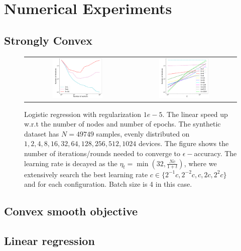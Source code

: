 


\section{Numerical Experiments}



\subsection{Strongly Convex}

\begin{figure}[h!]
\centering
\begin{tabular}{cc}
	\includegraphics[width=0.5\textwidth]{fig/E1-4-16speedupNodesT-min-w8a-epsilon013-b4-reg1e-05-adapt0.pdf} & 
\includegraphics[width=0.5\textwidth]{fig/E1-4-16speedupEpochsT-min-w8a-epsilon013-b4-reg1e-05-adapt0.pdf} 
\end{tabular}
	\caption{Logistic regression with regularization $1e-5$. The linear speed up w.r.t the number of nodes and number of epochs. The synthetic dataset has $N=49749$ samples, evenly distributed on $1, 2, 4, 8, 16, 32, 64, 128, 256, 512, 1024$ devices. The figure shows the number of iterations/rounds needed to converge to $\epsilon-$accuracy. The learning rate is decayed as the $\eta_t = \min(32, \frac{Nc}{1 + t})$, where we extensively search the best learning rate $c \in \{2^{-1}c, 2^{-2}c, c, 2c, 2^{2}c\}$ and for each configuration. Batch size is 4 in this case.}
\end{figure}



\subsection{Convex smooth objective}






\subsection{Linear regression}





